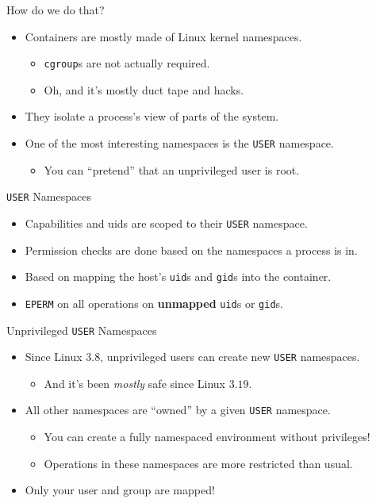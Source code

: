 \documentclass[10pt,aspectratio=169]{beamer}
\begin{document}
	\begin{frame}{How do we do that?}
		\begin{itemize}
			\item Containers are mostly made of Linux kernel namespaces.
			\begin{itemize}
				\item \texttt{cgroup}s are not actually required.
				\item Oh, and it's mostly duct tape and hacks.
			\end{itemize}
			\item They isolate a process's view of parts of the system.
			\item One of the most interesting namespaces is the \texttt{USER} namespace.
			\begin{itemize}
				\item You can ``pretend'' that an unprivileged user is root.
			\end{itemize}
		\end{itemize}
	\end{frame}

	\begin{frame}{\texttt{USER} Namespaces}
		\begin{itemize}
			\item Capabilities and uids are scoped to their \texttt{USER} namespace.
			\item Permission checks are done based on the namespaces a process is in.
			\item Based on mapping the host's \texttt{uid}s and \texttt{gid}s into the container.
			\item \texttt{EPERM} on all operations on \textbf{unmapped} \texttt{uid}s or \texttt{gid}s.
		\end{itemize}
	\end{frame}

	\begin{frame}{Unprivileged \texttt{USER} Namespaces}
		\begin{itemize}
			\item Since Linux $3.8$, unprivileged users can create new \texttt{USER} namespaces.
			\begin{itemize}
				\item And it's been \textit{mostly} safe since Linux $3.19$.
			\end{itemize}
			\item All other namespaces are ``owned'' by a given \texttt{USER} namespace.
			\begin{itemize}
				\item You can create a fully namespaced environment without privileges!
				\item Operations in these namespaces are more restricted than usual.
			\end{itemize}
			\item Only your user and group are mapped!
		\end{itemize}
	\end{frame}
\end{document}
